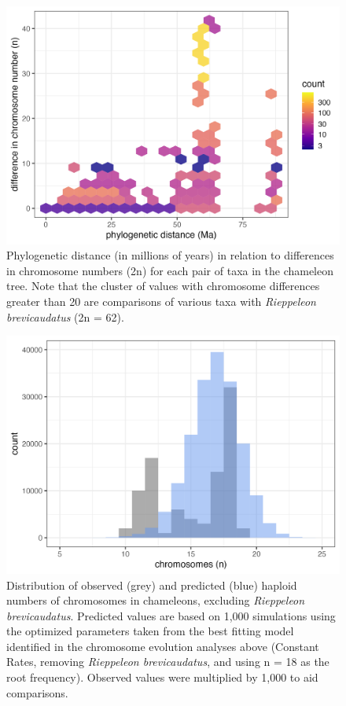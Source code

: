 \documentclass[a4paper, 12pt]{article}
\begin{document}
\newpage
\begin{figure}[h]
 \centering
  \includegraphics[width = \linewidth]{figures/species-pairs-distances.png}
  \caption{Phylogenetic distance (in millions of years) in relation to differences in chromosome numbers (2n) for each pair of taxa in the chameleon tree. Note that the cluster of values with chromosome differences greater than 20 are comparisons of various taxa with \textit{Rieppeleon brevicaudatus} (2n = 62).}
  \label{fig-pairwise}
\end{figure}

\newpage
\begin{figure}[h]
 \centering
  \includegraphics[width = \linewidth]{figures/chromevol-simulations-numbers-best.png}
  \caption{Distribution of observed (grey) and predicted (blue) haploid numbers of chromosomes in chameleons, excluding \textit{Rieppeleon brevicaudatus}. Predicted values are based on 1,000 simulations using the optimized parameters taken from the best fitting model identified in the chromosome evolution analyses above (Constant Rates, removing \textit{Rieppeleon brevicaudatus}, and using n = 18 as the root frequency). Observed values were multiplied by 1,000 to aid comparisons.
}
  \label{fig-predict}
\end{figure} 
\end{document}
